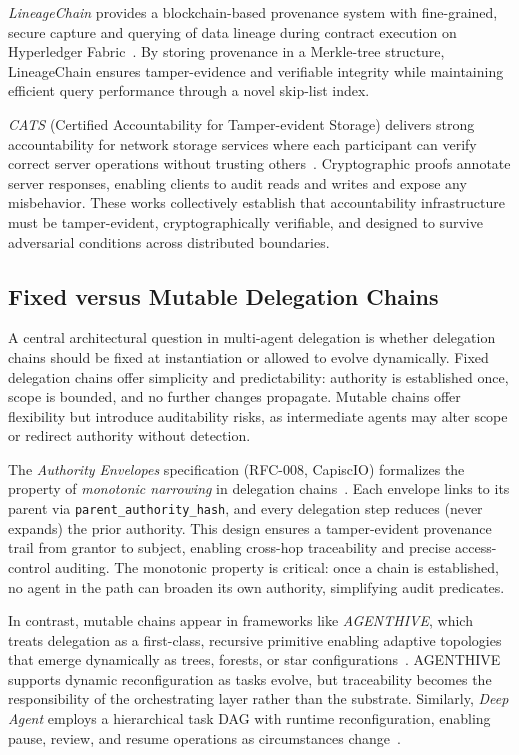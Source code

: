 \textit{LineageChain} provides a blockchain-based provenance system with fine-grained, secure capture and querying of data lineage during contract execution on Hyperledger Fabric~\cite{lineagechain-vldb2021}. By storing provenance in a Merkle-tree structure, LineageChain ensures tamper-evidence and verifiable integrity while maintaining efficient query performance through a novel skip-list index.

\textit{CATS} (Certified Accountability for Tamper-evident Storage) delivers strong accountability for network storage services where each participant can verify correct server operations without trusting others~\cite{cats-fast07}. Cryptographic proofs annotate server responses, enabling clients to audit reads and writes and expose any misbehavior. These works collectively establish that accountability infrastructure must be tamper-evident, cryptographically verifiable, and designed to survive adversarial conditions across distributed boundaries.

\subsection{Fixed versus Mutable Delegation Chains}
\label{sec:fixed-vs-mutable}

A central architectural question in multi-agent delegation is whether delegation chains should be fixed at instantiation or allowed to evolve dynamically. Fixed delegation chains offer simplicity and predictability: authority is established once, scope is bounded, and no further changes propagate. Mutable chains offer flexibility but introduce auditability risks, as intermediate agents may alter scope or redirect authority without detection.

The \textit{Authority Envelopes} specification (RFC-008, CapiscIO) formalizes the property of \textit{monotonic narrowing} in delegation chains~\cite{capiscIO-rfc008}. Each envelope links to its parent via \texttt{parent\_authority\_hash}, and every delegation step reduces (never expands) the prior authority. This design ensures a tamper-evident provenance trail from grantor to subject, enabling cross-hop traceability and precise access-control auditing. The monotonic property is critical: once a chain is established, no agent in the path can broaden its own authority, simplifying audit predicates.

In contrast, mutable chains appear in frameworks like \textit{AGENTHIVE}, which treats delegation as a first-class, recursive primitive enabling adaptive topologies that emerge dynamically as trees, forests, or star configurations~\cite{openreview-AGENTHIVE}. AGENTHIVE supports dynamic reconfiguration as tasks evolve, but traceability becomes the responsibility of the orchestrating layer rather than the substrate. Similarly, \textit{Deep Agent} employs a hierarchical task DAG with runtime reconfiguration, enabling pause, review, and resume operations as circumstances change~\cite{arXiv2502.07056}.

